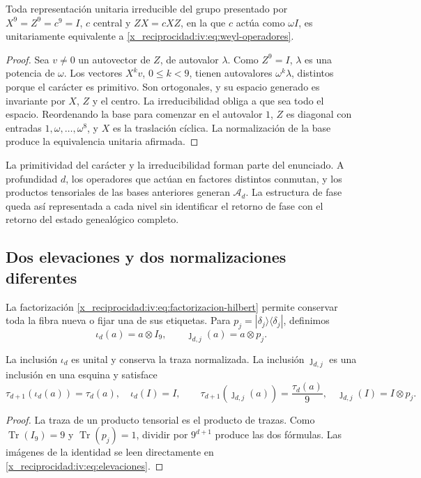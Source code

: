 \begin{theorem}
\label{x_reciprocidad:iv:thm:weyl-unicidad}
Toda representación unitaria irreducible del grupo presentado por
\(X^9=Z^9=c^9=I\), \(c\) central y \(ZX=cXZ\), en la que
\(c\) actúa como \(\omega I\), es unitariamente equivalente a
\eqref{x_reciprocidad:iv:eq:weyl-operadores}.
\end{theorem}
\begin{proof}
Sea \(v\neq0\) un autovector de \(Z\), de autovalor \(\lambda\).
Como \(Z^9=I\), \(\lambda\) es una potencia de \(\omega\).
Los vectores \(X^kv\), \(0\leq k<9\), tienen autovalores
\(\omega^k\lambda\), distintos porque el carácter es primitivo.
Son ortogonales, y su espacio generado es invariante por \(X\),
\(Z\) y el centro. La irreducibilidad obliga a que sea todo el
espacio. Reordenando la base para comenzar en el autovalor \(1\),
\(Z\) es diagonal con entradas \(1,\omega,\ldots,\omega^8\),
y \(X\) es la traslación cíclica. La normalización de la base
produce la equivalencia unitaria afirmada.
\end{proof}

La primitividad del carácter y la irreducibilidad forman parte del
enunciado. A profundidad \(d\), los operadores que actúan en factores
distintos conmutan, y los productos tensoriales de las bases anteriores
generan \(\mathcal A_d\). La estructura de fase queda así
representada a cada nivel sin identificar el retorno de fase con el
retorno del estado genealógico completo.

\subsection{Dos elevaciones y dos normalizaciones diferentes}

La factorización \eqref{x_reciprocidad:iv:eq:factorizacion-hilbert} permite conservar
toda la fibra nueva o fijar una de sus etiquetas. Para
\(p_j=|\delta_j\rangle\langle\delta_j|\), definimos
\begin{equation}
 \iota_d(a)=a\otimes I_9,
 \qquad \jmath_{d,j}(a)=a\otimes p_j.
 \label{x_reciprocidad:iv:eq:elevaciones}
\end{equation}
\begin{proposition}
\label{x_reciprocidad:iv:prop:unidad-traza}
La inclusión \(\iota_d\) es unital y conserva la traza normalizada.
La inclusión \(\jmath_{d,j}\) es una inclusión en una esquina y
satisface
\[
 \tau_{d+1}(\iota_d(a))=\tau_d(a),\quad \iota_d(I)=I,
 \qquad
 \tau_{d+1}(\jmath_{d,j}(a))=\frac{\tau_d(a)}9,
 \quad \jmath_{d,j}(I)=I\otimes p_j.
\]
\end{proposition}
\begin{proof}
La traza de un producto tensorial es el producto de trazas.
Como \(\operatorname{Tr}(I_9)=9\) y
\(\operatorname{Tr}(p_j)=1\), dividir por \(9^{d+1}\)
produce las dos fórmulas. Las imágenes de la identidad se leen
directamente en \eqref{x_reciprocidad:iv:eq:elevaciones}.
\end{proof}

